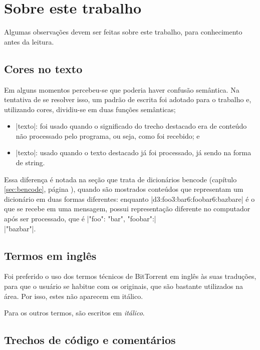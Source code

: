 
\newpage
\chapter*{Sobre este trabalho}

Algumas observações devem ser feitas sobre este trabalho, para conhecimento antes da
leitura.

\section*{Cores no texto}

Em alguns momentos percebeu-se que poderia haver confusão semântica. Na tentativa de se
resolver isso, um padrão de escrita foi adotado para o trabalho e, utilizando cores,
dividiu-se em duas funções semânticas;

\begin{itemize}
    \item \bverb|texto|: foi usado quando o significado do trecho destacado era de
        conteúdo não processado pelo programa, ou seja, como foi recebido; e

    \item \sverb|texto|: usado quando o texto destacado já foi processado, já sendo na
        forma de \gls{string}.
\end{itemize}

Essa diferença é notada na seção que trata de dicionários bencode (capítulo
\ref{sec:bencode}, página \pageref{sec:bencode}), quando são mostrados conteúdos que
representam um dicionário em duas formas diferentes: enquanto
\bverb|d3:foo3:bar6:foobar6:bazbare| é o que se recebe em uma mensagem, possui
representação diferente no computador após ser processado, que é
\sverb|{"foo": "bar", "foobar":| \\ \sverb|"bazbar"}|.

\section*{Termos em inglês}

Foi preferido o uso dos termos técnicos de BitTorrent em inglês às suas traduções, para
que o usuário se habitue com os originais, que são bastante utilizados na área. Por
isso, estes não aparecem em itálico.

Para os outros termos, são escritos em \emph{itálico}.

\section*{Trechos de código e comentários}

